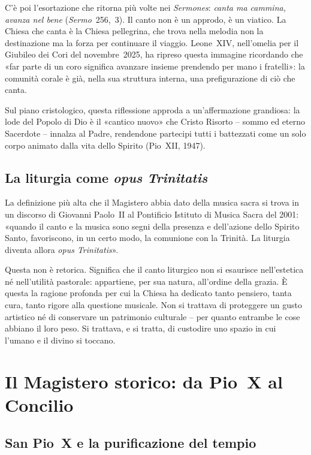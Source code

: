 \documentclass[12pt,a4paper]{article}
\begin{document}
	C'è poi l'esortazione che ritorna più volte nei \emph{Sermones}: \emph{canta
		ma cammina, avanza nel bene} (\emph{Sermo}~256,~3). Il canto non è un approdo,
	è un viatico. La Chiesa che canta è la Chiesa pellegrina, che trova nella
	melodia non la destinazione ma la forza per continuare il viaggio. Leone~XIV,
	nell'omelia per il Giubileo dei Cori del novembre~2025, ha ripreso questa
	immagine ricordando che «far parte di un coro significa avanzare insieme
	prendendo per mano i fratelli»: la comunità corale è già, nella sua struttura
	interna, una prefigurazione di ciò che canta.
	
	Sul piano cristologico, questa riflessione approda a un'affermazione grandiosa:
	la lode del Popolo di Dio è il «cantico nuovo» che Cristo Risorto -- sommo ed
	eterno Sacerdote -- innalza al Padre, rendendone partecipi tutti i battezzati
	come un solo corpo animato dalla vita dello Spirito (Pio~XII, 1947).
	
	\subsection{La liturgia come \emph{opus Trinitatis}}
	
	La definizione più alta che il Magistero abbia dato della musica sacra si trova
	in un discorso di Giovanni Paolo~II al Pontificio Istituto di Musica Sacra del
	2001: «quando il canto e la musica sono segni della presenza e dell'azione dello
	Spirito Santo, favoriscono, in un certo modo, la comunione con la Trinità. La
	liturgia diventa allora \emph{opus Trinitatis}».
	
	Questa non è retorica. Significa che il canto liturgico non si esaurisce
	nell'estetica né nell'utilità pastorale: appartiene, per sua natura, all'ordine
	della grazia. È questa la ragione profonda per cui la Chiesa ha dedicato tanto
	pensiero, tanta cura, tanto rigore alla questione musicale. Non si trattava di
	proteggere un gusto artistico né di conservare un patrimonio culturale -- per
	quanto entrambe le cose abbiano il loro peso. Si trattava, e si tratta, di
	custodire uno spazio in cui l'umano e il divino si toccano.
	
	\section{Il Magistero storico: da Pio~X al Concilio}
	
	\subsection{San Pio~X e la purificazione del tempio}
	
\end{document}
